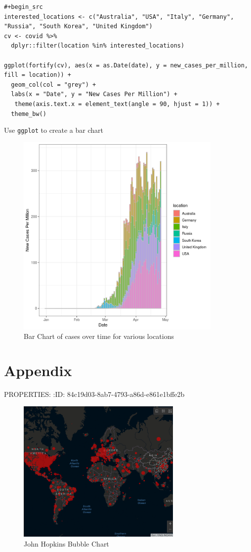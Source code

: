 \documentclass[11pt]{article}
\begin{document}
\begin{listing}[htbp]
\begin{verbatim}
#+begin_src
interested_locations <- c("Australia", "USA", "Italy", "Germany", "Russia", "South Korea", "United Kingdom")
cv <- covid %>%
  dplyr::filter(location %in% interested_locations)

ggplot(fortify(cv), aes(x = as.Date(date), y = new_cases_per_million, fill = location)) +
  geom_col(col = "grey") +
  labs(x = "Date", y = "New Cases Per Million") +
   theme(axis.text.x = element_text(angle = 90, hjust = 1)) +
  theme_bw()
\end{verbatim}
\caption{\label{orgeb27ca5}Use \texttt{ggplot} to create a bar chart}
\end{listing}


\begin{figure}[htbp]
\centering
\includegraphics[width=10cm]{barex.png}
\caption{\label{fig:org244afa4}Bar Chart of cases over time for various locations}
\end{figure}


\section{Appendix}
\label{sec:orgb5a39e8}
PROPERTIES:
:ID:       84c19d03-8ab7-4793-a86d-e861e1bffe2b
\begin{figure}[htbp]
\centering
\includegraphics[width=8cm]{hopinScreen.png}
\caption{\label{fig:org2e5afd2}John Hopkins Bubble Chart \cite{2020o}}
\end{figure}
\end{document}
